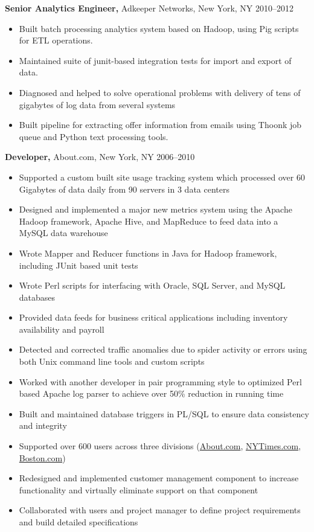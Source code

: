 \documentclass[margin]{res}
\begin{document}
\begin{resume}
{\bf Senior Analytics Engineer,} Adkeeper Networks, New York, NY \hfill  2010--2012
\begin{itemize}
  \item Built batch processing analytics system based on Hadoop, using Pig scripts for ETL operations.
  \item Maintained suite of junit-based integration tests for import and export of data.
  \item Diagnosed and helped to solve operational problems with delivery of tens of gigabytes of log data from several systems
  \item Built pipeline for extracting offer information from emails using Thoonk job queue and Python text processing tools.
\end{itemize}

{\bf Developer,} About.com, New York, NY \hfill  2006--2010
\begin{itemize}
  \item Supported a custom built site usage tracking system which processed
    over 60 Gigabytes of data daily from 90 servers in 3 data centers
  \item Designed and implemented a major new metrics system using the Apache
    Hadoop framework, Apache Hive, and MapReduce to feed data into a MySQL data
    warehouse
  \item Wrote Mapper and Reducer functions in Java for Hadoop framework,
    including JUnit based unit tests
  \item Wrote Perl scripts for interfacing with Oracle, SQL Server, and
    MySQL databases
  \item Provided data feeds for business critical applications including
    inventory availability and payroll
  \item Detected and corrected traffic anomalies due to spider activity or
    errors using both Unix command line tools and custom scripts
  \item Worked with another developer in pair programming style to optimized
    Perl based Apache log parser to achieve over 50\% reduction in running time
  \item Built and maintained database triggers in PL/SQL to ensure data
    consistency and integrity
  \item Supported over 600 users across three divisions
    (\href{http://www.about.com}{About.com},
    \href{http://www.nytimes.com}{NYTimes.com},
    \href{http://www.boston.com}{Boston.com})
  \item Redesigned and implemented customer management component to
    increase functionality and virtually eliminate support on that component
  \item Collaborated with users and project manager to define project requirements
      and build detailed specifications
\end{itemize}


\end{resume}
\end{document}
